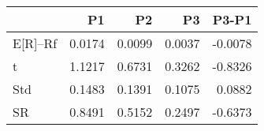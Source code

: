\begin{tabular}{lrrrr}
\toprule
 & P1 & P2 & P3 & P3-P1 \\
\midrule
E[R]--Rf & 0.0174 & 0.0099 & 0.0037 & -0.0078 \\
t & 1.1217 & 0.6731 & 0.3262 & -0.8326 \\
Std & 0.1483 & 0.1391 & 0.1075 & 0.0882 \\
SR & 0.8491 & 0.5152 & 0.2497 & -0.6373 \\
\bottomrule
\end{tabular}
